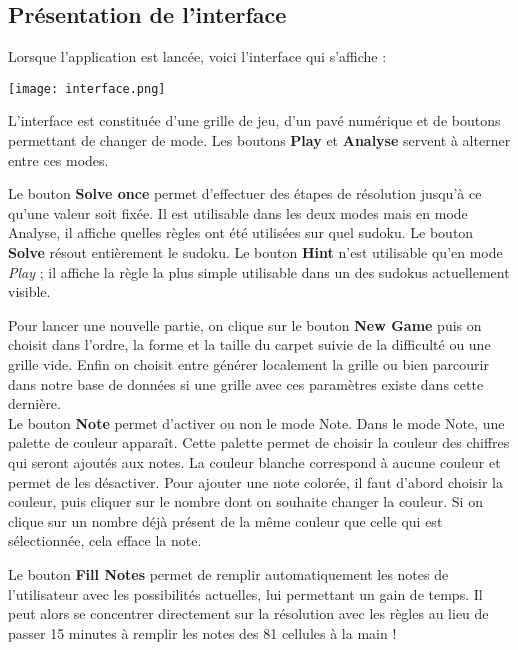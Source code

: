 \documentclass[a4paper]{article}
\begin{document}
\subsection{Présentation de l'interface}
\begin{justify}
    Lorsque l'application est lancée, voici l'interface qui s'affiche :
    \begin{center}
    \texttt{[image: interface.png]}
    \end{center}
    
    L'interface est constituée d'une grille de jeu, d'un pavé numérique et de boutons permettant de changer de mode. Les boutons \textbf{Play} et \textbf{Analyse} servent à alterner entre ces modes.

    Le bouton \textbf{Solve once} permet d'effectuer des étapes de résolution jusqu'à ce qu'une valeur soit fixée. Il est utilisable dans les deux modes mais en mode Analyse, il affiche quelles règles ont été utilisées sur quel sudoku. Le bouton \textbf{Solve} résout entièrement le sudoku. Le bouton \textbf{Hint} n'est utilisable qu'en mode \textit{Play} ; il affiche la règle la plus simple utilisable dans un des sudokus actuellement visible.
    
    Pour lancer une nouvelle partie, on clique sur le bouton \textbf{New Game} puis on choisit dans l'ordre, la forme et la taille du carpet suivie de la difficulté ou une grille vide. Enfin on choisit entre générer localement la grille ou bien parcourir dans notre base de données si une grille avec ces paramètres existe dans cette dernière. \\
    
    Le bouton \textbf{Note} permet d'activer ou non le mode Note.
    Dans le mode Note, une palette de couleur apparaît. Cette palette permet de choisir la couleur des chiffres qui seront ajoutés aux notes. La couleur blanche correspond à aucune couleur et permet de les désactiver. Pour ajouter une note colorée, il faut d'abord choisir la couleur, puis cliquer sur le nombre dont on souhaite changer la couleur. Si on clique sur un nombre déjà présent de la même couleur que celle qui est sélectionnée, cela efface la note.
    
    Le bouton \textbf{Fill Notes} permet de remplir automatiquement les notes de l'utilisateur avec les possibilités actuelles, lui permettant un gain de temps. Il peut alors se concentrer directement sur la résolution avec les règles au lieu de passer 15 minutes à remplir les notes des 81 cellules à la main ! \\


\end{justify}
\end{document}
